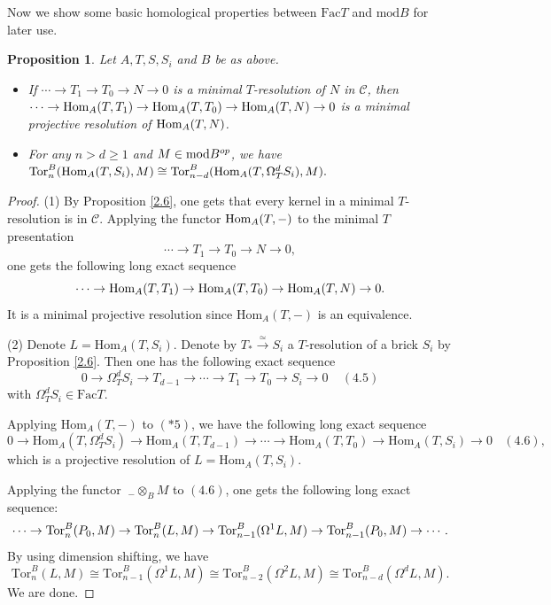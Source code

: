 \documentclass[a4paper]{amsart}
\newtheorem{prop}[thm]{Proposition}
\theoremstyle{definition}
\theoremstyle{remark}
\numberwithin{equation}{section}
\begin{document}
Now we show some basic homological properties between $\text{Fac}T$ and $\text{mod}B$ for later use.

\begin{prop}\label{4.4}
Let $A, T, S, S_i$ and $ B$ be as above.
\begin{itemize}
\item[(1)] If $\cdots\to T_1\to T_0\to N\to 0 $ is a minimal $T$-resolution of $N$ in $\mathcal{C}$, then $\cdots\to \textup{Hom}_A(T,T_1)\to \textup{Hom}_A(T, T_0)\to\textup{Hom}_A(T, N)\to 0$ is a minimal projective resolution of $\textup{Hom}_A(T, N)$.
\item [(2)] For any $n>d\geq1$ and $M\in\textup{mod}B^{op}$, we have
$\textup{Tor}^B_n (\textup{Hom}_A(T, S_i), M)\cong \textup{Tor}^B_{n-d} (\textup{Hom}_A (T, \Omega^d_T S_i), M).$
\end{itemize}
\end{prop}

\begin{proof}(1) By Proposition \ref{2.6}, one gets that every kernel in a minimal $T$-resolution is in $\mathcal{C}$. Applying the functor ${\rm Hom}_A(T, -)$  to the minimal $T$ presentation $$\cdots\to T_1\to T_0\to N\to 0 ,$$ one gets the following long exact sequence $$\cdots\to \textup{Hom}_A(T,T_1)\to \textup{Hom}_A(T, T_0)\to\textup{Hom}_A(T, N)\to 0.$$ It is a minimal projective resolution since $\text{Hom}_A(T,-)$ is an equivalence.

(2) Denote $L=\text{Hom}_A(T, S_i)$.
Denote by $T_* \xrightarrow{\simeq} S_i$ a $T$-resolution of a brick $S_i$ by Proposition \ref{2.6}. Then one has the following exact sequence
$$0\to \Omega_T^d S_i \to  T_{d-1} \to \cdots \to T_1 \to T_0 \to S_i \to 0\ \ \ \ \ (4.5)$$ with $\Omega_T^d S_i\in\text{Fac}T$.

Applying  $\text{Hom}_A (T, -)$ to  $(*5)$, we have the following long exact sequence
 $$0\to \text{Hom}_A(T,\Omega_T^d S_i) \to  \text{Hom}_A(T,T_{d-1} )\to \cdots \to \text{Hom}_A(T, T_0) \to \text{Hom}_A(T, S_i) \to 0\ \ \ \ (4.6),$$
which is a projective resolution of $L=\text{Hom}_A(T, S_i)$.

Applying the functor  $~_-\otimes_B M$ to  $(4.6)$, one gets the following long exact sequence:
\begin{align*}
\cdots\to\textup{Tor}_n^B(P_0, M) \to \textup{Tor}_n^B(L, M)\to \textup{Tor}_{n-1}^B(\Omega^1L, M)\to \textup{Tor}_{n-1}^B(P_0, M)\to\cdots.
\end{align*}
By using dimension shifting, we have
$$\text{Tor}_n^B (L, M) \cong \text{Tor}_{n-1}^B (\Omega^1 L, M) \cong \text{Tor}_{n-2}^B (\Omega^2 L, M) \cong \text{Tor}_{n-d}^B (\Omega^d L, M).
$$
We are done.
\end{proof}
\end{document}
